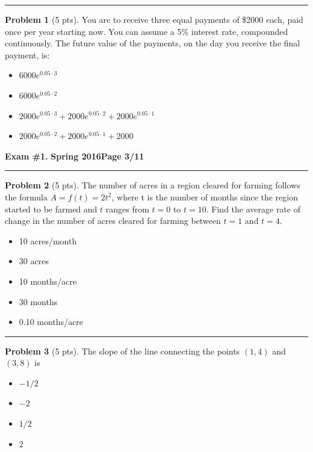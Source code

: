\documentclass[12pt]{article}
\makeatletter
\theoremstyle{definition}
\newtheorem{problem}{Problem}
\newcommand*{\radiobutton}{%
  \@ifstar{\@radiobutton0}{\@radiobutton1}%
}
\newcommand*{\@radiobutton}[1]{%
  \begin{tikzpicture}
    \pgfmathsetlengthmacro\radius{height("X")/2}
    \draw[radius=\radius] circle;
    \ifcase#1 \fill[radius=.6*\radius] circle;\fi
  \end{tikzpicture}%
}
\makeatother
\begin{document}
\vspace{2cm}
\hrule
\begin{problem}[5 pts]
You are to receive three equal payments of \$2000 each, paid once per year starting now. You can assume a 5\% interest rate, compounded continuously. The future value of the payments, on the day you receive the final payment, is:
\begin{itemize}
\item[\radiobutton] $6000 e^{0.05 \cdot 3}$
\item[\radiobutton] $6000 e^{0.05 \cdot 2}$
\item[\radiobutton] $2000 e^{0.05 \cdot 3} + 2000 e^{0.05 \cdot 2} + 2000 e^{0.05 \cdot 1}$
\item[\radiobutton] $2000 e^{0.05 \cdot 2} + 2000 e^{0.05 \cdot 1} + 2000$
\end{itemize}
\end{problem}
\newpage

\hfill{\large\bf Exam \#1.}\hfill{\large\bf
  Spring 2016}\hfill{\large\bf Page 3/11}\hrule

\bigskip
\begin{problem}[5 pts]
The number of acres in a region cleared for farming follows the formula $A = f (t) = 2t^2$, where t is the number of months since the region started to be farmed and $t$ ranges from $t = 0$ to $t = 10$. Find the average rate of change in the number of acres cleared for farming between $t = 1$ and $t = 4$. 
\begin{itemize}
\item[\radiobutton] 10 acres/month
\item[\radiobutton] 30 acres
\item[\radiobutton] 10 months/acre
\item[\radiobutton] 30 months
\item[\radiobutton] 0.10 months/acre
\end{itemize}
\end{problem}

\vspace{5cm}
\hrule

\begin{problem}[5 pts]
The slope of the line connecting the points $(1, 4)$ and $(3, 8)$ is
\begin{itemize}
\item[\radiobutton] $-1/2$
\item[\radiobutton] $-2$
\item[\radiobutton] $1/2$
\item[\radiobutton] $2$
\end{itemize}
\end{problem}
\end{document}
